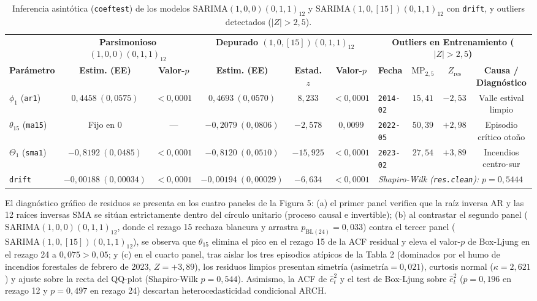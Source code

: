 \documentclass[10pt, a4paper]{article}
\begin{document}
\begin{table}[H]
\centering
\scriptsize
\setlength{\tabcolsep}{2.1pt}
\caption{Inferencia asintótica (\texttt{coeftest}) de los modelos $\text{SARIMA}(1,0,0)(0,1,1)_{12}$ y $\text{SARIMA}(1,0,[15])(0,1,1)_{12}$ con \texttt{drift}, y outliers detectados ($|Z|>2,5$).}
\begin{tabular}{lccccclccc}
\toprule
& \multicolumn{2}{c}{\textbf{Parsimonioso $(1,0,0)(0,1,1)_{12}$}} & \multicolumn{3}{c}{\textbf{Depurado $(1,0,[15])(0,1,1)_{12}$}} & \multicolumn{4}{c}{\textbf{Outliers en Entrenamiento ($|Z| > 2,5$)}} \\
\cmidrule(lr){2-3} \cmidrule(lr){4-6} \cmidrule(lr){7-10}
\textbf{Parámetro} & \textbf{Estim. (EE)} & \textbf{Valor-$p$} & \textbf{Estim. (EE)} & \textbf{Estad. $z$} & \textbf{Valor-$p$} & \textbf{Fecha} & \textbf{$\text{MP}_{2,5}$} & \textbf{$Z_{\text{res}}$} & \textbf{Causa / Diagnóstico} \\
\midrule
$\phi_1$ (\texttt{ar1}) & $0,4458\ (0,0575)$ & $<0,0001$ & $0,4693\ (0,0570)$ & $8,233$ & $<0,0001$ & \texttt{2014-02} & $15,41$ & $-2,53$ & Valle estival limpio \\
$\theta_{15}$ (\texttt{ma15}) & Fijo en $0$ & --- & $-0,2079\ (0,0806)$ & $-2,578$ & $0,0099$ & \texttt{2022-05} & $50,39$ & $+2,98$ & Episodio crítico otoño \\
$\Theta_1$ (\texttt{sma1}) & $-0,8192\ (0,0485)$ & $<0,0001$ & $-0,8120\ (0,0510)$ & $-15,925$ & $<0,0001$ & \texttt{2023-02} & $27,54$ & $+3,89$ & Incendios centro-sur \\
\texttt{drift} & $-0,00188\ (0,00034)$ & $<0,0001$ & $-0,00194\ (0,00029)$ & $-6,634$ & $<0,0001$ & \multicolumn{4}{l}{\textit{Shapiro-Wilk (\texttt{res.clean}):} $p = 0,5444$} \\
\bottomrule
\end{tabular}
\end{table}
\vspace{-0.2cm}

El diagnóstico gráfico de residuos se presenta en los cuatro paneles de la Figura 5: (a) el primer panel verifica que la raíz inversa AR y las 12 raíces inversas SMA se sitúan estrictamente dentro del círculo unitario (proceso causal e invertible); (b) al contrastar el segundo panel ($\text{SARIMA}(1,0,0)(0,1,1)_{12}$, donde el rezago 15 rechaza blancura y arrastra $p_{\text{BL}(24)} = 0,033$) contra el tercer panel ($\text{SARIMA}(1,0,[15])(0,1,1)_{12}$), se observa que $\theta_{15}$ elimina el pico en el rezago 15 de la ACF residual y eleva el valor-$p$ de Box-Ljung en el rezago 24 a $0,075 > 0,05$; y (c) en el cuarto panel, tras aislar los tres episodios atípicos de la Tabla 2 (dominados por el humo de incendios forestales de febrero de 2023, $Z = +3,89$), los residuos limpios presentan simetría ($\text{asimetría} = 0,021$), curtosis normal ($\kappa = 2,621$) y ajuste sobre la recta del QQ-plot (Shapiro-Wilk $p = 0,544$). Asimismo, la ACF de $\hat{e}_t^2$ y el test de Box-Ljung sobre $\hat{e}_t^2$ ($p = 0,196$ en rezago 12 y $p = 0,497$ en rezago 24) descartan heterocedasticidad condicional ARCH.
\end{document}
